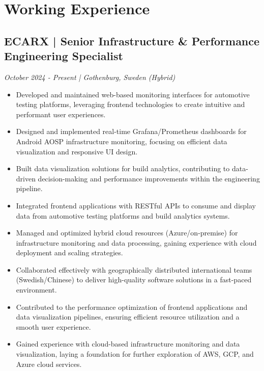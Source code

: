 \documentclass[11pt,a4paper]{article}
\begin{document}
\section*{Working Experience}

\subsection*{ECARX | Senior Infrastructure \& Performance Engineering Specialist}
\textit{October 2024 - Present | Gothenburg, Sweden (Hybrid)}
\begin{itemize}[noitemsep]
\item Developed and maintained web-based monitoring interfaces for automotive testing platforms, leveraging frontend technologies to create intuitive and performant user experiences.
\item Designed and implemented real-time Grafana/Prometheus dashboards for Android AOSP infrastructure monitoring, focusing on efficient data visualization and responsive UI design.
\item Built data visualization solutions for build analytics, contributing to data-driven decision-making and performance improvements within the engineering pipeline.
\item Integrated frontend applications with RESTful APIs to consume and display data from automotive testing platforms and build analytics systems.
\item Managed and optimized hybrid cloud resources (Azure/on-premise) for infrastructure monitoring and data processing, gaining experience with cloud deployment and scaling strategies.
\item Collaborated effectively with geographically distributed international teams (Swedish/Chinese) to deliver high-quality software solutions in a fast-paced environment.
\item Contributed to the performance optimization of frontend applications and data visualization pipelines, ensuring efficient resource utilization and a smooth user experience.
\item Gained experience with cloud-based infrastructure monitoring and data visualization, laying a foundation for further exploration of AWS, GCP, and Azure cloud services.
\end{itemize}
\end{document}
